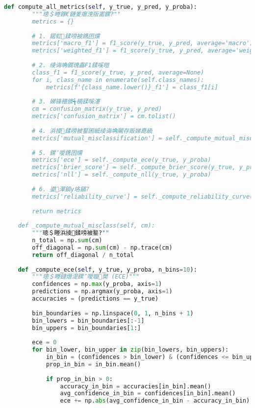 {{{{{{{{{{{{{{{{{\begin{lstlisting}[language=Python,caption=缁煎悎璇勪及鎸囨爣瀹炵幇]
    def compute_all_metrics(self, y_true, y_pred, y_proba):
        """璁＄畻鎵€鏈夎瘎浼版寚鏍?""
        metrics = {}
        
        # 1. 鍩虹鍒嗙被鎸囨爣
        metrics['macro_f1'] = f1_score(y_true, y_pred, average='macro')
        metrics['weighted_f1'] = f1_score(y_true, y_pred, average='weighted')
        
        # 2. 绫诲埆鐗瑰畾F1鍒嗘暟
        class_f1 = f1_score(y_true, y_pred, average=None)
        for i, class_name in enumerate(self.class_names):
            metrics[f'{class_name.lower()}_f1'] = class_f1[i]
        
        # 3. 娣锋穯鐭╅樀鍒嗘瀽
        cm = confusion_matrix(y_true, y_pred)
        metrics['confusion_matrix'] = cm.tolist()
        
        # 4. 浜掕鍒嗙被鐜囷紙绫诲埆闂存贩娣嗭級
        metrics['mutual_misclassification'] = self._compute_mutual_misclass(cm)
        
        # 5. 鏍″噯鎸囨爣
        metrics['ece'] = self._compute_ece(y_true, y_proba)
        metrics['brier_score'] = self._compute_brier_score(y_true, y_proba)
        metrics['nll'] = self._compute_nll(y_true, y_proba)
        
        # 6. 鍙潬鎬у垎鏋?
        metrics['reliability_curve'] = self._compute_reliability_curve(y_true, y_proba)
        
        return metrics
    
    def _compute_mutual_misclass(self, cm):
        """璁＄畻浜掕鍒嗙被鐜?""
        n_total = np.sum(cm)
        off_diagonal = np.sum(cm) - np.trace(cm)
        return off_diagonal / n_total
    
    def _compute_ece(self, y_true, y_proba, n_bins=10):
        """璁＄畻鏈熸湜鏍″噯璇樊 (ECE)"""
        confidences = np.max(y_proba, axis=1)
        predictions = np.argmax(y_proba, axis=1)
        accuracies = (predictions == y_true)
        
        bin_boundaries = np.linspace(0, 1, n_bins + 1)
        bin_lowers = bin_boundaries[:-1]
        bin_uppers = bin_boundaries[1:]
        
        ece = 0
        for bin_lower, bin_upper in zip(bin_lowers, bin_uppers):
            in_bin = (confidences > bin_lower) & (confidences <= bin_upper)
            prop_in_bin = in_bin.mean()
            
            if prop_in_bin > 0:
                accuracy_in_bin = accuracies[in_bin].mean()
                avg_confidence_in_bin = confidences[in_bin].mean()
                ece += np.abs(avg_confidence_in_bin - accuracy_in_bin) * prop_in_bin
        

\end{lstlisting}}}}}}}}}}}}}}}}}}
